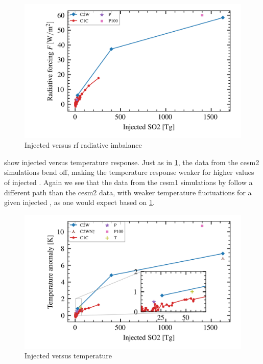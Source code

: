 \documentclass{ametsocV5}
\newcommand{\iso}[1][i]{{#1}njected \ce{SO2}}
\begin{document}
\begin{figure}[t]
  \begin{center}
    \includegraphics[width=0.95\linewidth]{figures/injection_vs_toa.png}
  \end{center}
  \caption{Injected  versus \ac{rf} radiative imbalance}%
  \label{fig:so2_vs_toa}
\end{figure}

 show \iso{} versus temperature response. Just as in
\cref{fig:so2_vs_toa}, the data from the \ac{cesm2} simulations bend off, making the
temperature response weaker for higher values of \iso. Again we see that the data from
the \ac{cesm1} simulations by \citet{ottobliesner2016} follow a different path than the
\ac{cesm2} data, with weaker temperature fluctuations for a given \iso{}, as one would
expect based on \cref{fig:so2_vs_toa}.

\begin{figure}[t]
  \begin{center}
    \includegraphics[width=0.95\linewidth]{figures/injection_vs_temperature.png}
  \end{center}
  \caption{Injected  versus temperature}%
  \label{fig:so2_vs_temp}
\end{figure}
\end{document}
